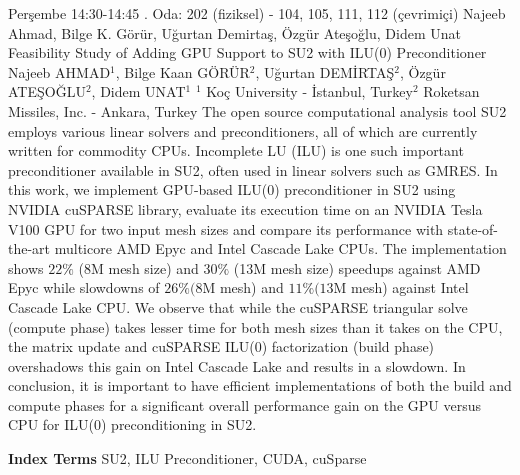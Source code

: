 
    \begin{abstract_basarim}
    {Perşembe 14:30-14:45}
    {.}
    {Oda: 202 (fiziksel) - 104, 105, 111, 112 (çevrimiçi)}
    {Najeeb Ahmad, Bilge K. Görür, Uğurtan Demirtaş, Özgür Ateşoğlu, Didem Unat}
    {Feasibility Study of Adding GPU Support to SU2 with ILU(0) Preconditioner}
    {%
    Najeeb AHMAD$^{1}$, Bilge Kaan GÖRÜR$^{2}$, Uğurtan DEMİRTAŞ$^{2}$, Özgür ATEŞOĞLU$^{2}$, Didem UNAT$^{1}$}
    {%
    }
    {%
    $^1$ Koç University - İstanbul, Turkey\newline{}$^2$ Roketsan Missiles, Inc. - Ankara, Turkey}
    The open source computational analysis tool SU2 employs various linear solvers and preconditioners, all of which are currently written for commodity CPUs. Incomplete LU (ILU) is one such important preconditioner available in SU2, often used in linear solvers such as GMRES. In this work, we implement GPU-based ILU(0) preconditioner in SU2 using NVIDIA cuSPARSE library, evaluate its execution time on an NVIDIA Tesla V100 GPU for two input mesh sizes and compare its performance with state-of-the-art multicore AMD Epyc and Intel Cascade Lake CPUs. The implementation shows $22 \%$ (8M mesh size) and $30 \%$ (13M mesh size) speedups against AMD Epyc while slowdowns of $26 \%(8 \mathrm{M}$ mesh) and $11 \%(13 \mathrm{M}$ mesh) against Intel Cascade Lake CPU. We observe that while the cuSPARSE triangular solve (compute phase) takes lesser time for both mesh sizes than it takes on the CPU, the matrix update and cuSPARSE ILU(0) factorization (build phase) overshadows this gain on Intel Cascade Lake and results in a slowdown. In conclusion, it is important to have efficient implementations of both the build and compute phases for a significant overall performance gain on the GPU versus CPU for ILU(0) preconditioning in SU2. 
    
            \textbf{Index Terms} \newline{}SU2, ILU Preconditioner, CUDA, cuSparse
    \end{abstract_basarim}
    